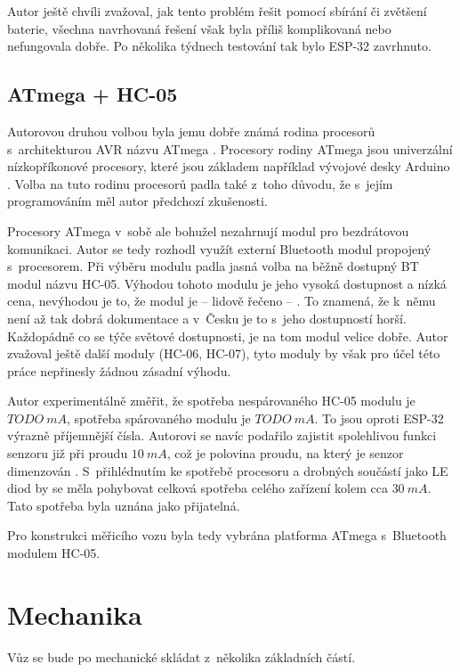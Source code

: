 Autor ještě chvíli zvažoval, jak tento problém řešit pomocí sbírání či zvětšení
baterie, všechna navrhovaná řešení však byla příliš komplikovaná nebo
nefungovala dobře. Po několika týdnech testování tak bylo ESP-32 zavrhnuto.

\subsection{ATmega + HC-05}
\label{subsec:wsm-atmega}

Autorovou druhou volbou byla jemu dobře známá rodina procesorů s~architekturou
AVR názvu ATmega \cite{avr}. Procesory rodiny ATmega jsou univerzální
nízkopříkonové procesory, které jsou základem například vývojové desky Arduino
\cite{arduino}. Volba na tuto rodinu procesorů padla také z~toho důvodu, že
s~jejím programováním měl autor předchozí zkušenosti.

Procesory ATmega v~sobě ale bohužel nezahrnují modul pro bezdrátovou komunikaci.
Autor se tedy rozhodl využít externí Bluetooth modul propojený s~procesorem.
Při výběru modulu padla jasná volba na běžně dostupný BT modul názvu HC-05.
Výhodou tohoto modulu je jeho vysoká dostupnost a nízká cena, nevýhodou je to,
že modul je -- lidově řečeno -- . To znamená, že k~němu není až
tak dobrá dokumentace a v~Česku je to s~jeho dostupností horší. Každopádně
co se týče světové dostupnosti, je na tom modul velice dobře. Autor zvažoval
ještě další moduly (HC-06, HC-07), tyto moduly by však pro účel této práce
nepřinesly žádnou zásadní výhodu.

Autor experimentálně změřit, že spotřeba nespárovaného HC-05 modulu je
$TODO\ mA$, spotřeba spárovaného modulu je $TODO\ mA$. To jsou oproti ESP-32
výrazně příjemnější čísla. Autorovi se navíc podařilo zajistit spolehlivou
funkci senzoru již při proudu $10\ mA$, což je polovina proudu, na který
je senzor dimenzován \cite{gp1s23:datasheet}. S~přihlédnutím ke spotřebě procesoru
a drobných součástí jako LE diod by se měla pohybovat celková spotřeba celého
zařízení kolem cca $30\ mA$. Tato spotřeba byla uznána jako přijatelná.

Pro konstrukci měřicího vozu byla tedy vybrána platforma ATmega s~Bluetooth
modulem HC-05.

\section{Mechanika}
\label{sec:wsm-mech}

Vůz se bude po mechanické skládat z~několika základních částí.

